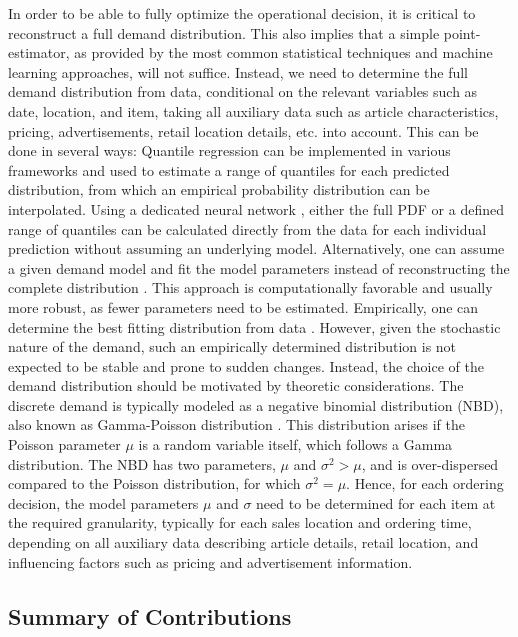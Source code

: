 \documentclass[BCOR=1mm, DIV=calc,10pt,
twoside=true,
twocolumn,
headings=normal]{scrartcl}
\begin{document}
In order to be able to fully optimize the operational decision, it is critical to reconstruct a full demand distribution. This also implies that a simple point-estimator, as provided by the most common statistical techniques and machine learning approaches, will not suffice. Instead, we need to determine the full demand distribution from data, conditional on the relevant variables such as date, location, and item, taking all auxiliary data such as article characteristics, pricing, advertisements, retail location details, etc. into account. This can be done in several ways: Quantile regression \cite{koenker2001,wen2017} can be implemented in various frameworks and used to estimate a range of quantiles for each predicted distribution, from which an empirical probability distribution can be interpolated. Using a dedicated neural network \cite{Feindt2006190}, either the full PDF or a defined range of quantiles can be calculated directly from the data for each individual prediction without assuming an underlying model. Alternatively, one can assume a given demand model and fit the model parameters instead of reconstructing the complete distribution \cite{astonpr373, SALINAS20201181}. This approach is computationally favorable and usually more robust, as fewer parameters need to be estimated. Empirically, one can determine the best fitting distribution from data \cite{adan1995}. However, given the stochastic nature of the demand, such an empirically determined distribution is not expected to be stable and prone to sudden changes. Instead, the choice of the demand distribution should be motivated by theoretic considerations. The discrete demand is typically modeled as a negative binomial distribution (NBD), also known as Gamma-Poisson distribution \cite{Ehrenberg1959,Ehrenberg1967,Ehrenberg1972,Chatfield1973,Schmittlein_1985}. This distribution arises if the Poisson parameter $\mu$ is a random variable itself, which follows a Gamma distribution. The NBD has two parameters, $\mu$ and $ \sigma^2 > \mu$, and is over-dispersed compared to the Poisson distribution, for which $\sigma^2 = \mu$. Hence, for each ordering decision, the model parameters $\mu$ and $\sigma$ need to be determined for each item at the required granularity, typically for each sales location and ordering time, depending on all auxiliary data describing article details, retail location, and influencing factors such as pricing and advertisement information.

\subsection*{Summary of Contributions}
\end{document}
